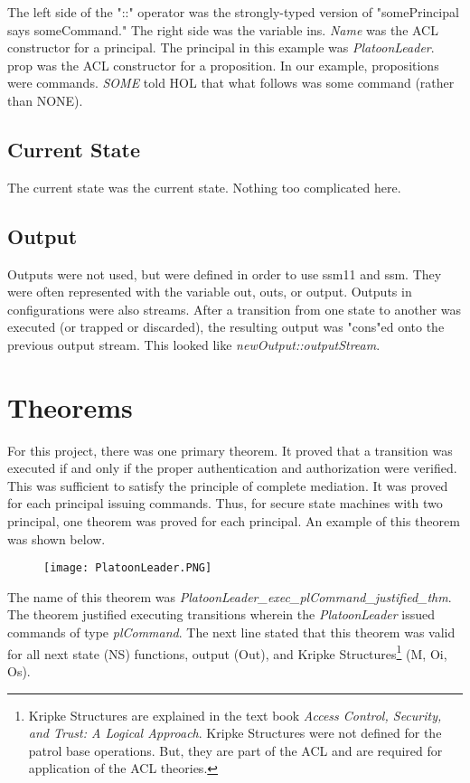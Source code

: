 The left side of the "::" operator was the strongly-typed version of "somePrincipal says someCommand." The right side was the variable ins.  \emph{Name} was the ACL constructor for a principal.  The principal in this example was \emph{PlatoonLeader}.  prop was the ACL constructor for a proposition.  In our example, propositions were commands.  \emph{SOME} told HOL that what follows was some command (rather than NONE).

\subsection{Current State}
\label{sec:current-state}

The current state was the current state.  Nothing too complicated here.

\subsection{Output}
\label{sec:output}

Outputs were not used, but were defined in order to use ssm11 and ssm.  They were often represented with the variable out, outs, or output.  Outputs in configurations were also streams.  After a transition from one state to another was executed (or trapped or discarded), the resulting output was "cons"ed onto the previous output stream.  This looked like \emph{newOutput::outputStream}.

\section{Theorems}
\label{sec:theorems}

For this project, there was one primary theorem.  It proved that a transition was executed if and only if the proper authentication and authorization were verified.  This was sufficient to satisfy the principle of complete mediation.  It was proved for each principal issuing commands.  Thus, for secure state machines with two principal, one theorem was proved for each principal.  An example of this theorem was shown below.\\
  
\begin{figure}[h]
  \centering
  \texttt{[image: PlatoonLeader.PNG]}
\end{figure}

The name of this theorem was \emph{PlatoonLeader_exec_plCommand_justified_thm}.  The theorem justified executing transitions wherein the \emph{PlatoonLeader} issued commands of type \emph{plCommand}.  The next line stated that this theorem was valid for all next state (NS) functions, output (Out), and Kripke Structures\footnote{Kripke Structures are explained in the text book \emph{Access Control, Security, and Trust: A Logical Approach}. Kripke Structures were not defined for the patrol base operations.  But, they are part of the ACL and are required for application of the ACL theories.} (M, Oi, Os).  \\

